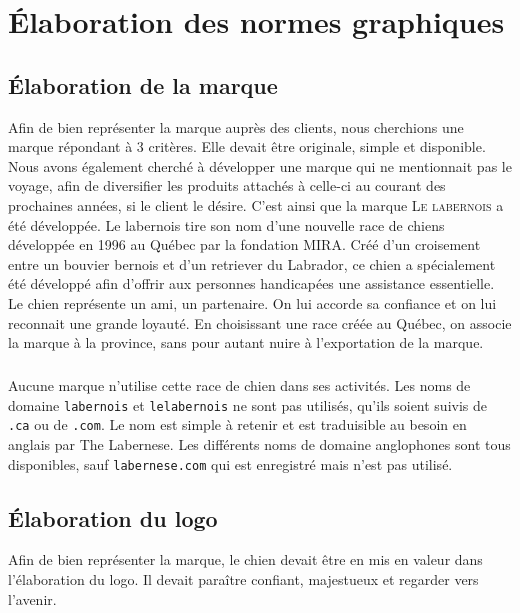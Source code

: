 \documentclass{scrreprt}
\begin{document}
\chapter{Élaboration des normes graphiques}

\section{Élaboration de la marque}
Afin de bien représenter la marque auprès des clients, nous cherchions une
marque répondant à 3 critères. Elle devait être originale, simple et
disponible. Nous avons également cherché à développer une marque qui ne
mentionnait pas le voyage, afin de diversifier les produits attachés à celle-ci
au courant des prochaines années, si le client le désire.
C’est ainsi que la marque \textsc{Le labernois} a été développée. Le
labernois tire son nom d’une nouvelle race de chiens développée en 1996 au
Québec par la fondation MIRA. Créé d’un croisement entre un bouvier bernois et
d’un retriever du Labrador, ce chien a spécialement été développé afin d’offrir
aux personnes handicapées une assistance essentielle.
Le chien représente un ami, un partenaire. On lui accorde sa confiance et on
lui reconnait une grande loyauté. En choisissant une race créée au Québec, on
associe la marque à la province, sans pour autant nuire à l’exportation de la
marque.

\paragraph{}
Aucune marque n'utilise cette race de chien dans ses activités. Les noms de
domaine \texttt{labernois} et \texttt{lelabernois} ne sont pas utilisés, qu’ils
soient suivis de \texttt{.ca} ou de \texttt{.com}. Le nom est simple à retenir
et est traduisible au besoin en anglais par \textmd{The Labernese}. Les
différents noms de domaine anglophones sont tous disponibles, sauf
\texttt{labernese.com} qui est enregistré mais n’est pas utilisé.

\newpage

\section{Élaboration du logo}
Afin de bien représenter la marque, le chien devait être en mis en valeur dans
l’élaboration du logo. Il devait paraître confiant, majestueux et regarder vers
l’avenir.
\end{document}
